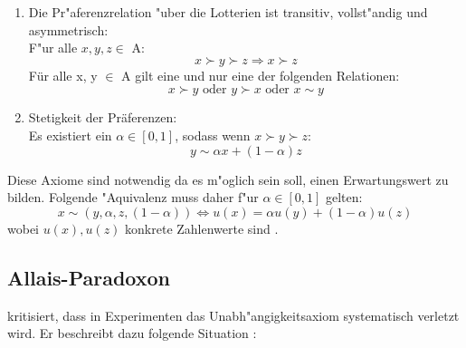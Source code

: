 \documentclass[11pt]{article}
\begin{document}
\begin{itemize}
\begin{enumerate}
    
  \item Die Pr"aferenzrelation "uber die Lotterien ist transitiv, vollst"andig und asymmetrisch:\\
    F"ur alle $x, y, z \in$ A:
      \begin{equation}
      \label{eq:1}
     x \succ y \succ z \Rightarrow x \succ z \tag{Transitivit"at}
    \end{equation}
    F\"ur alle x, y $\in$ A gilt eine und nur eine der folgenden Relationen:
    \begin{equation}
      \label{eq:2}
     x \succ y \text{ oder } y \succ x \text{ oder } x \sim y \tag{Vollst"andigkeit  \& Asymmetrie}
    \end{equation}
  \item Stetigkeit der Pr\"aferenzen:\\
    Es existiert ein $\alpha \in [0,1]$, sodass wenn $x \succ y \succ z$:
    \begin{equation}
      \label{eq:3}
      y \sim \alpha x + (1-\alpha) z \tag{Stetigkeit}
    \end{equation}
  \end{enumerate}
\end{itemize}

Diese Axiome sind notwendig da es m"oglich sein soll, einen Erwartungswert zu bilden. Folgende "Aquivalenz muss daher f"ur $\alpha \in [0,1]$ gelten: 
\begin{equation}
  \label{eq:5}
  x \sim (y, \alpha, z, (1-\alpha)) \Leftrightarrow u(x) = \alpha u(y) + (1-\alpha)u(z)
\end{equation}
wobei $u(x),u(z)$ konkrete Zahlenwerte sind \parencite[siehe ][S. 190f.]{rieck2012spieltheorie}.

\subsection{Allais-Paradoxon}
\label{sec:allais-paradoxon}

\textcite{allais_paradox} kritisiert, dass in Experimenten das Unabh"angigkeitsaxiom systematisch verletzt wird. Er beschreibt dazu folgende Situation \parencite[S. 527]{allais_paradox}: 
\end{document}
